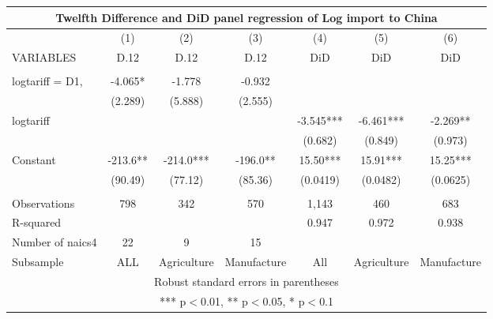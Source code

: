 \begin{tabular}{lcccccc}
\multicolumn{7}{c}{Twelfth Difference and DiD panel regression of Log import to China} \\ \hline
 & (1) & (2) & (3) & (4) & (5) & (6) \\
VARIABLES & D.12 & D.12 & D.12 & DiD & DiD & DiD \\ \hline
 &  &  &  &  &  &  \\
logtariff = D1, & -4.065* & -1.778 & -0.932 &  &  &  \\
 & (2.289) & (5.888) & (2.555) &  &  &  \\
logtariff &  &  &  & -3.545*** & -6.461*** & -2.269** \\
 &  &  &  & (0.682) & (0.849) & (0.973) \\
Constant & -213.6** & -214.0*** & -196.0** & 15.50*** & 15.91*** & 15.25*** \\
 & (90.49) & (77.12) & (85.36) & (0.0419) & (0.0482) & (0.0625) \\
 &  &  &  &  &  &  \\
Observations & 798 & 342 & 570 & 1,143 & 460 & 683 \\
R-squared &  &  &  & 0.947 & 0.972 & 0.938 \\
Number of naics4 & 22 & 9 & 15 &  &  &  \\
 Subsample & ALL & Agriculture & Manufacture & All & Agriculture & Manufacture \\ \hline
\multicolumn{7}{c}{ Robust standard errors in parentheses} \\
\multicolumn{7}{c}{ *** p$<$0.01, ** p$<$0.05, * p$<$0.1} \\
\end{tabular}
